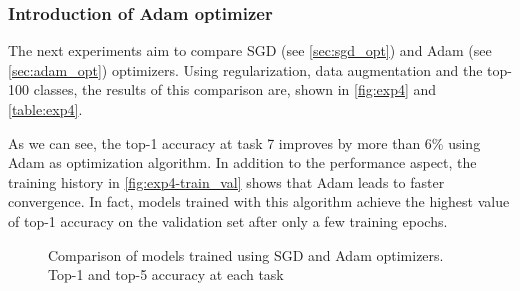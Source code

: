 \subsubsection{Introduction of Adam optimizer}
The next experiments aim to compare SGD (see \autoref{sec:sgd_opt}) and Adam (see \autoref{sec:adam_opt}) optimizers.
Using regularization, data augmentation and the top-100 classes, the results of this comparison are, shown in \autoref{fig:exp4} and \autoref{table:exp4}.

As we can see, the top-1 accuracy at task 7 improves by more than 6\% using Adam as optimization algorithm. 
In addition to the performance aspect, the training history in \autoref{fig:exp4-train_val} shows that Adam leads to faster convergence. In fact, models trained with this algorithm achieve the highest value of top-1 accuracy on the validation set after only a few training epochs.



\begin{figure}[H]
	\centering
	\caption{Comparison of models trained using SGD and Adam optimizers. Top-1 and top-5 accuracy at each task}%
	\label{fig:exp4}%
\end{figure}

